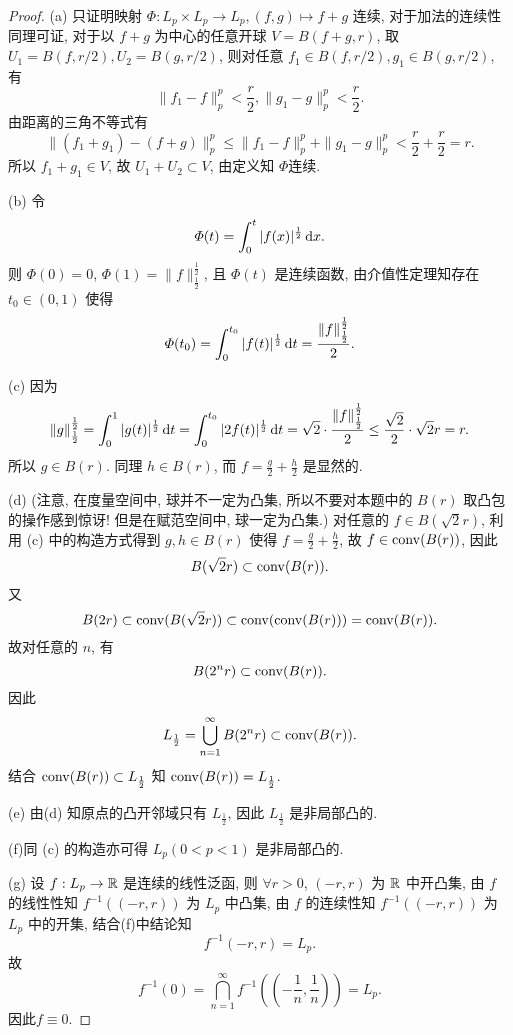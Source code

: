\begin{proof}
    (a) 只证明映射 $\varPhi:L_p\times L_p\to L_p,(f,g)\mapsto f+g$ 连续,
    对于加法的连续性同理可证, 对于以 $f+g$ 为中心的任意开球 $V=B(f+g,r)$,
    取 $U_1=B(f,r/2),U_2=B(g,r/2)$, 则对任意 $f_1\in B(f,r/2),g_1\in B(g,r/2)$, 有
    \[\|f_1-f\|_p^p<\frac{r}{2},\|g_1-g\|_p^p<\frac{r}{2}.\]
    由距离的三角不等式有
    \[\|(f_1+g_1)-(f+g)\|_p^p\leq\|f_1-f\|_p^p+\|g_1-g\|_p^p<\frac{r}{2}+\frac{r}{2}=r.\]
    所以 $f_1+g_1\in V$, 故 $U_1+U_2\subset V$, 由定义知 $\varPhi$连续.

    (b) 令
    \[\varPhi(t)=\int_0^t|f(x)|^{\frac{1}{2}}\mathop{}\!\mathrm{d} x.\]
    则 $\varPhi(0)=0$, $\varPhi(1)=\|f\|_{\frac{1}{2}}^{\frac{1}{2}}$,
    且 $\varPhi(t)$ 是连续函数, 由介值性定理知存在 $t_0\in(0,1)$ 使得
    \[\varPhi(t_0)=\int_0^{t_0}|f(t)|^{\frac{1}{2}}\mathop{}\!\mathrm{d} t=\frac{\|f\|_{\frac{1}{2}}^{\frac{1}{2}}}{2}.\]

    (c) 因为
    \[\|g\|_{\frac{1}{2}}^{\frac{1}{2}}=\int_0^1|g(t)|^{\frac{1}{2}}\mathop{}\!\mathrm{d} t=\int_0^{t_0}|2f(t)|^{\frac{1}{2}}\mathop{}\!\mathrm{d} t=\sqrt{2}\cdot\frac{\|f\|_{\frac{1}{2}}^{\frac{1}{2}}}{2}\leq\frac{\sqrt{2}}{2}\cdot\sqrt{2}r=r.\]
    所以 $g\in B(r)$. 同理 $h\in B(r)$, 而 $f=\frac{g}{2}+\frac{h}{2}$ 是显然的.

    (d) (注意, 在度量空间中, 球并不一定为凸集, 所以不要对本题中的 $B(r)$ 取凸包的操作感到惊讶! 但是在赋范空间中, 球一定为凸集.)
    对任意的 $f\in B(\sqrt{2}r)$, 利用 (c) 中的构造方式得到 $g,h\in B(r)$ 使得 $f=\frac{g}{2}+\frac{h}{2}$,
    故 $f\in \operatorname{conv}(B(r))$, 因此
    \[B(\sqrt{2}r)\subset \operatorname{conv}(B(r)).\]
    又
    \[B(2r)\subset \operatorname{conv}(B(\sqrt{2}r))\subset \operatorname{conv}(\operatorname{conv}(B(r)))=\operatorname{conv}(B(r)).\]
    故对任意的 $n$, 有
    \[B(2^nr)\subset \operatorname{conv}(B(r)).\]
    因此
    \[L_{\frac{1}{2}}=\bigcup_{n=1}^{\infty} B(2^nr)\subset \operatorname{conv}(B(r)).\]
    结合 $\operatorname{conv}(B(r))\subset L_{\frac{1}{2}}$ 知 $\operatorname{conv}(B(r))=L_{\frac{1}{2}}$.

    (e) 由(d) 知原点的凸开邻域只有 $L_{\frac{1}{2}}$, 因此 $L_{\frac{1}{2}}$ 是非局部凸的.

    (f)同 (c) 的构造亦可得 $L_p(0<p<1)$ 是非局部凸的.

    (g) 设 $f:L_p\to\mathbb{R}$ 是连续的线性泛函,
    则 $\forall r>0$, $(-r,r)$ 为 $\mathbb{R}$ 中开凸集,
    由 $f$ 的线性性知 $f^{-1}((-r,r))$ 为 $L_p$ 中凸集, 
    由 $f$ 的连续性知 $f^{-1}((-r,r))$ 为 $L_p$ 中的开集, 结合(f)中结论知
    \[f^{-1}(-r,r)=L_p.\]
    故
    \[f^{-1}(0)=\bigcap_{n=1}^{\infty}f^{-1}\left(\left(-\frac{1}{n},\frac{1}{n}\right)\right)=L_p.\]
    因此$f\equiv 0$.
\end{proof}